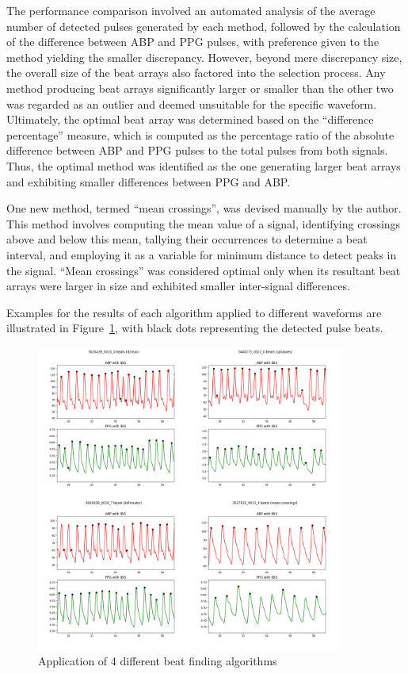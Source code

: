 The performance comparison involved an automated analysis of the average number of detected pulses generated by each method, followed by the calculation of the difference between ABP and PPG pulses, with preference given to the method yielding the smaller discrepancy.
However, beyond mere discrepancy size, the overall size of the beat arrays also factored into the selection process.
Any method producing beat arrays significantly larger or smaller than the other two was regarded as an outlier and deemed unsuitable for the specific waveform.
Ultimately, the optimal beat array was determined based on the \enquote{difference percentage} measure, which is computed as the percentage ratio of the absolute difference between ABP and PPG pulses to the total pulses from both signals.
Thus, the optimal method was identified as the one generating larger beat arrays and exhibiting smaller differences between PPG and ABP\@.

One new method, termed \enquote{mean crossings}, was devised manually by the author.
This method involves computing the mean value of a signal, identifying crossings above and below this mean,
tallying their occurrences to determine a beat interval, and employing it as a variable for minimum distance to detect peaks in the signal.
\enquote{Mean crossings} was considered optimal only when its resultant beat arrays were larger in size and exhibited smaller inter-signal differences.

Examples for the results of each algorithm applied to different waveforms are illustrated in Figure~\ref{fig:beat_algos}, with black dots representing the detected pulse beats.

\begin{figure}[h]
    \includegraphics[width=0.9\textwidth]{images/methods/beat_algos}
    \caption{Application of 4 different beat finding algorithms}
    \label{fig:beat_algos}
\end{figure}

